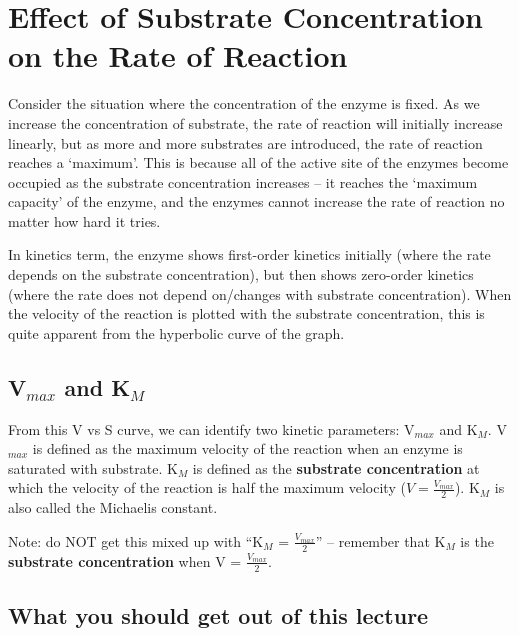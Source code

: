 \section{Effect of Substrate Concentration on the Rate of Reaction}

\begin{center}
\end{center}

Consider the situation where the concentration of the enzyme is fixed.
As we increase the concentration of substrate, the rate of reaction will initially increase linearly, but as more and more substrates are introduced, the rate of reaction reaches a `maximum'.
This is because all of the active site of the enzymes become occupied as the substrate concentration increases -- it reaches the `maximum capacity' of the enzyme, and the enzymes cannot increase the rate of reaction no matter how hard it tries.

\begin{center}
\end{center}

In kinetics term, the enzyme shows first-order kinetics initially (where the rate depends on the substrate concentration), but then shows zero-order kinetics (where the rate does not depend on/changes with substrate concentration).
When the velocity of the reaction is plotted with the substrate concentration, this is quite apparent from the hyperbolic curve of the graph.

\subsection{V$_{max}$ and K$_M$}

From this V vs S curve, we can identify two kinetic parameters: V$_{max}$ and K$_M$.
V$_{max}$ is defined as the maximum velocity of the reaction when an enzyme is saturated with substrate.
K$_M$ is defined as the \textbf{substrate concentration} at which the velocity of the reaction is half the maximum velocity ($V = \frac{V_{max}}{2}$).
K$_M$ is also called the Michaelis constant.

Note: do NOT get this mixed up with ``K$_M$ = $\frac{V_{max}}{2}$'' -- remember that K$_M$ is the \textbf{substrate concentration} when V = $\frac{V_{max}}{2}$.

\subsection*{What you should get out of this lecture}


